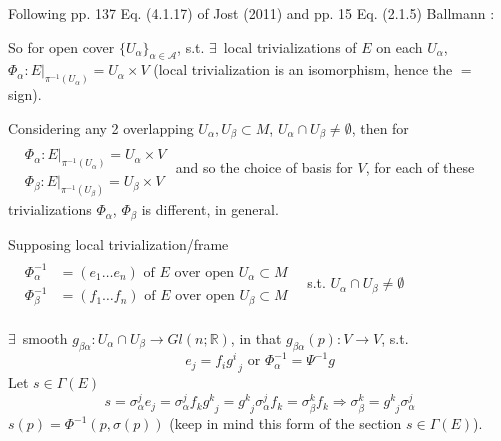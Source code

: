 \documentclass[10pt]{amsart}
\begin{document}
\begin{multicols*}{2}
Following pp. 137 Eq. (4.1.17) of Jost (2011) \cite{JJost2011} and pp. 15 Eq. (2.1.5) Ballmann \cite{WBallmann2002}:

So for open cover $\lbrace U_{\alpha} \rbrace_{\alpha \in \mathcal{A}}$, s.t. $\exists \, $ local trivializations of $E$ on each $U_{\alpha}$, $\Phi_{\alpha} : \left. E \right|_{\pi^{-1}(U_{\alpha})} = U_{\alpha} \times V$ (local trivialization is an isomorphism, hence the $=$ sign).  

Considering any 2 overlapping $U_{\alpha}, U_{\beta} \subset M$, $U_{\alpha} \cap U_{\beta} \neq \emptyset$, then for $\begin{aligned} & \quad \\
  & \Phi_{\alpha} : \left. E \right|_{\pi^{-1}(U_{\alpha}) } = U_{\alpha} \times V \\ 
  & \Phi_{\beta} : \left. E \right|_{\pi^{-1}(U_{\beta}) } = U_{\beta} \times V 
\end{aligned}$
and so the choice of basis for $V$, for each of these trivializations $\Phi_{\alpha}$, $\Phi_{\beta}$ is different, in general.  

Supposing local trivialization/frame $\begin{aligned} & \quad \\ 
  & \Phi_{\alpha}^{-1}  & = (e_1 \dots e_n) \text{ of $E$ over open $U_{\alpha} \subset M$ } \\ 
  & \Phi_{\beta}^{-1}   & = (f_1 \dots f_n) \text{ of $E$ over open $U_{\beta} \subset M$ } \\ 
\end{aligned}$ s.t. $U_{\alpha} \cap U_{\beta} \neq \emptyset$

$\exists \, $ smooth $g_{\beta \alpha} : U_{\alpha} \cap U_{\beta} \to Gl(n;\mathbb{R})$, in that $g_{\beta \alpha}(p) : V \to V$, s.t.
\[
e_j = f_i g^i_{\; \; j} \text{ or } \Phi_{\alpha}^{-1} = \Psi^{-1} g
\]
Let $s \in \Gamma(E)$
\[
s = \sigma^j_{\alpha} e_j = \sigma^j_{\alpha} f_k g^k_{\; \; j} = g^k_{ \; \; j} \sigma^j_{\alpha} f_k = \sigma^k_{\beta} f_k \Longrightarrow \sigma^k_{\beta} = g^k_{ \; \; j} \sigma^j_{ \alpha }
\]
$s(p) = \Phi^{-1}(p,\sigma(p))$ (keep in mind this form of the section $s\in \Gamma(E)$).


\end{multicols*}
\end{document}
